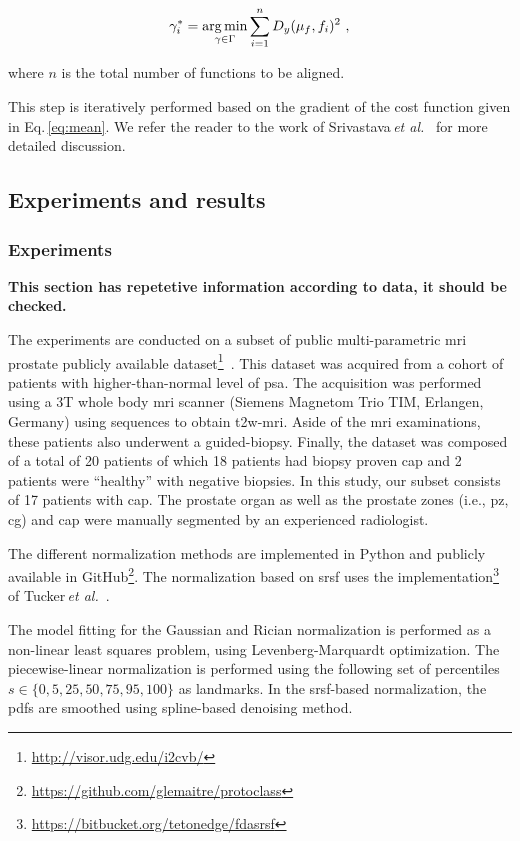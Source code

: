 \begin{equation}
  \gamma_{i}^{*} = \operatorname*{arg\,min}_{\gamma \in \Gamma} \sum_{i = 1}^{n} D_y(\mu_f, f_i)^2 \ ,
  \label{eq:warpi}
\end{equation}

\noindent where $n$ is the total number of functions to be aligned.

This step is iteratively performed based on the gradient of the cost function given in Eq.\,\eqref{eq:mean}. 
We refer the reader to the work of Srivastava\,\textit{et al.}~\cite{Srivastava2011} for more detailed discussion.


\subsection{Experiments and results}\label{subsec:chp5:T2-norm:Exp-res}

\subsubsection{Experiments}\label{subsub:chp5:T2-norm:res}
{\color{red}\textbf{This section has repetetive information according to data, it should be checked.}}

The experiments are conducted on a subset of public multi-parametric \ac{mri} prostate publicly available dataset\footnote{\url{http://visor.udg.edu/i2cvb/}}~\cite{lemaitre2015boosting}.
This dataset was acquired from a cohort of patients with higher-than-normal level of \ac{psa}. 
The acquisition was performed using a 3T whole body \ac{mri} scanner (Siemens Magnetom Trio TIM, Erlangen, Germany) using sequences to obtain \ac{t2w}-\ac{mri}. 
Aside of the \ac{mri} examinations, these patients also underwent a guided-biopsy. 
Finally, the dataset was composed of a total of 20 patients of which 18 patients had biopsy proven \ac{cap} and 2 patients were ``healthy'' with negative biopsies. 
In this study, our subset consists of 17 patients with \ac{cap}. 
The prostate organ as well as the prostate zones (i.e., \ac{pz}, \ac{cg}) and \ac{cap} were manually segmented by an experienced radiologist.

The different normalization methods are implemented in Python and publicly available in GitHub\footnote{\url{https://github.com/glemaitre/protoclass}}.
The normalization based on \ac{srsf} uses the implementation\footnote{\url{https://bitbucket.org/tetonedge/fdasrsf}} of Tucker\,\textit{et al.}~\cite{Tucker2013}.

The model fitting for the Gaussian and Rician normalization is performed as a non-linear least squares problem, using Levenberg-Marquardt optimization.
The piecewise-linear normalization is performed using the following set of percentiles $s \in \{0, 5, 25, 50, 75, 95, 100 \}$ as landmarks.
In the \ac{srsf}-based normalization, the \acp{pdf} are smoothed using spline-based denoising method.

